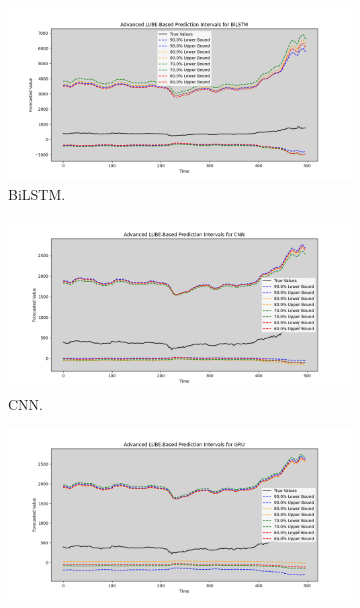 \begin{figure}[H]
    \centering
        \begin{minipage}{0.6\textwidth}
            \centering
            \begin{subfigure}[b]{\textwidth}
                \centering
                \includegraphics[width=\textwidth]{Chap02/figs/BiLSTM_advanced_lube_plot_ADANIPORTS.png}
                \caption{BiLSTM.}
            \end{subfigure}
            \hfill
            \begin{subfigure}[b]{\textwidth}
                \centering
                \includegraphics[width=\textwidth]{Chap02/figs/CNN_advanced_lube_plot_ADANIPORTS.png}
                \caption{CNN.}
            \end{subfigure}
            \begin{subfigure}[b]{\textwidth}
                \centering
                \includegraphics[width=\textwidth]{Chap02/figs/GRU_advanced_lube_plot_ADANIPORTS.png}

\end{subfigure}
\end{minipage}
\end{figure}
